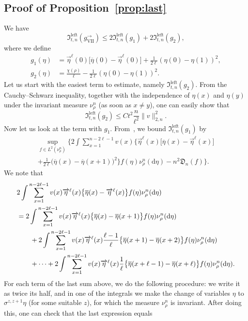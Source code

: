\documentclass[AHL,Unicode,longabstracts]{cedram}
\newcommand*{\rmleft}{\mathrm{left}}
\newcommand*{\rmVII}{\mathrm{VII}}
\newcommand{\mf}[1]{{\mathfrak #1}}
\renewcommand\vec[1]{\overrightarrow{#1}}
\renewcommand{\bar}{\overline}
\renewcommand{\leq}{\leqslant}
\newcommand*{\dd}{\mathrm{d}}
\begin{document}
\subsection{Proof of Proposition~\ref{prop:last}} \label{ssec:separate}

We have
\[
\mf I_{t,n}^{\rmleft}(g_{\rmVII}^\rightarrow) \leq 2\mf I_{t,n}^{\rmleft}(g_1) + 2 \mf I_{t,n}^{\rmleft}(g_2),
\]
where we define
\begin{align*}
g_1(\eta)&=\vec\eta^\ell(0) \Big[\bar\eta(0)-\vec\eta^\ell(0)\Big] + \frac{1}{2\ell}(\eta(0)-\eta(1))^2,
\\ g_2(\eta) &= \frac{\chi(\rho)}{\ell}-\frac{1}{2\ell} (\eta(0)-\eta(1))^2.
\end{align*}
Let us start with the easiest term to estimate, namely $\mf I_{t,n}^{\rmleft}(g_2)$. From the Cauchy--Schwarz inequality, together with the independence of $\eta(x)$ and $\eta(y)$ under the invariant measure $\nu^n_\rho$ (as soon as $x\neq y$), one can easily show that
\[
\mf I_{t,n}^{\rmleft}(g_2) \leq Ct^2\frac{n}{\ell^2} \|v\|_{2,n}^2.
\]
Now let us look at the term with $g_1$. From~\cite[Lemma~2.4]{KLO}, we bound $\mf I_{t,n}^{\rmleft}(g_1)$ by
\begin{multline}\label{eq:multline}
\sup_{f\in L^2(\nu^n_\rho)} \bigg\{2\int \sum_{x=1}^{n-2\ell-1}v(x)\Big\{\vec{\eta}^{\ell}(x)\Big[\bar\eta(x)-\vec{\eta}^{\ell}(x)\Big]\\
+\frac{1}{2\ell}
\big(\bar{\eta}(x)-\bar{\eta}(x+1)\big)^2\Big\}f(\eta)\nu^n_\rho(\dd\eta) - n^2 \mathfrak D_n(f)\bigg\}.
\end{multline}
We note that
\begin{align}
&2\int \sum_{x=1}^{n-2\ell-1}v(x)\vec{\eta}^\ell(x)\big\{\bar{\eta}(x)-\vec{\eta}^\ell(x)\big\}f(\eta)\nu^n_\rho(\dd\eta)\label{eq:firstpart}
\\
& =2\int \sum_{x=1}^{n-2\ell-1}v(x)\vec{\eta}^\ell(x)\big\{\bar{\eta}(x)-\bar{\eta}(x+1)\big\}f(\eta)\nu^n_\rho(\dd\eta)\label{eq:ff}
\\
&\qquad +2\int \sum_{x=1}^{n-2\ell-1}v(x)\vec{\eta}^\ell(x)\frac{\ell-1}{\ell}\big\{\bar{\eta}(x+1)-\bar{\eta}(x+2)\big\}f(\eta)\nu^n_\rho(\dd\eta)\notag\\
&\qquad +\cdots+2 \int \sum_{x=1}^{n-2\ell-1}v(x)\vec{\eta}^\ell(x)\frac{1}{\ell}\big\{\bar{\eta}(x+\ell-1)-\bar{\eta}(x+\ell)\big\}f(\eta)\nu^n_\rho(\dd\eta).\notag
\end{align}
For each term of the last sum above, we do the following procedure: we write it as twice its half, and in one of the integrals we make the change of variables $\eta$ to $\sigma^{z,z+1}\eta$ (for some suitable $z$), for which the measure $\nu^n_\rho$ is invariant. After doing this, one can check that the last expression equals
\end{document}
